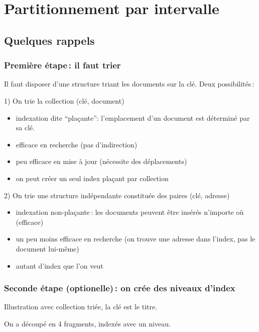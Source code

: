 \section{Partitionnement par intervalle}

\subsection{Quelques rappels}


\begin{frame}
\frametitle{Première étape\,: il faut trier}

Il faut disposer d'une structure triant les documents sur la clé. Deux possibilités\,:

\vfill

\alert{1) On trie la collection (clé, document)}

\begin{itemize}
  \item indexation dite ``plaçante'': l'emplacement d'un document est déterminé par sa clé.
  \item efficace en recherche (pas d'indirection)
  \item peu efficace en mise à jour (nécessite des déplacements)  
  \item on peut créer un seul index plaçant par collection
\end{itemize}

\alert{2) On trie une structure indépendante constituée des paires (clé, adresse) }

\begin{itemize}
  \item indexation non-plaçante\,: les documents peuvent être insérés n'importe où (efficace)
  \item un peu moins efficace en recherche (on trouve une adresse dans l'index, pas le document lui-même)
  \item autant d'index que l'on veut
\end{itemize}

\end{frame}



\begin{frame}
\frametitle{Seconde étape (optionelle)\,: on crée des niveaux d'index}

Illustration avec \alert{collection triée}, la clé est le titre.


On a découpé en \alert{4 fragments}, 
indexés avec un niveau.

\end{frame}



